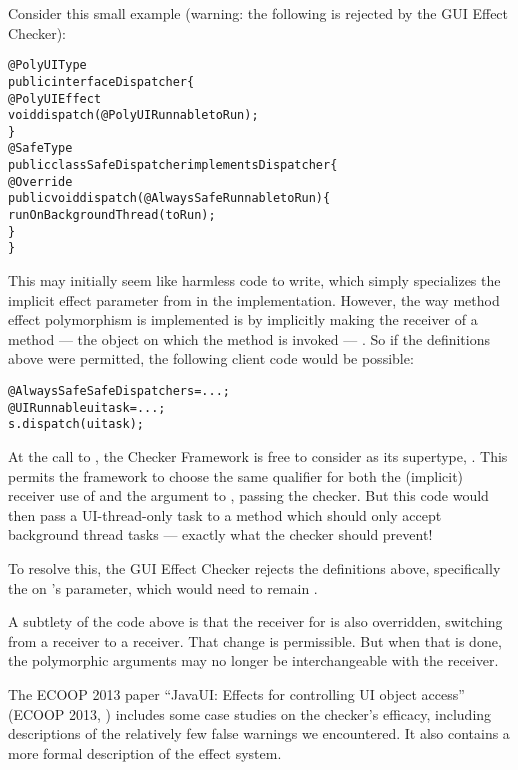 Consider this small example (warning: the following is rejected by the GUI Effect Checker):

\begin{alltt}
@PolyUIType
public interface Dispatcher \{
    @PolyUIEffect
    void dispatch(@PolyUI Runnable toRun);
\}
@SafeType
public class SafeDispatcher implements Dispatcher \{
    @Override
    public void dispatch(@AlwaysSafe Runnable toRun) \{
        runOnBackgroundThread(toRun);
    \}
\}
\end{alltt}

This may initially seem like harmless code to write, which simply specializes the implicit effect
parameter from  in the  implementation.  However, the way
method effect polymorphism is implemented is by implicitly making the receiver of a
 method --- the object on which the method is invoked --- .  So
if the definitions above were permitted, the following client code would be possible:

\begin{alltt}
@AlwaysSafe SafeDispatcher s = ...;
@UI Runnable uitask = ...;
s.dispatch(uitask);
\end{alltt}

At the call to , the Checker Framework is free to consider  as its
supertype, .  This permits the framework to choose the same qualifier for
both the (implicit) receiver use of  and the  argument to
, passing the checker.  But this code would then pass a UI-thread-only
task to a method which should only accept background thread tasks --- exactly what the checker
should prevent!

To resolve this, the GUI Effect Checker rejects the definitions above, specifically the
 on 's parameter, which would need to remain
.

A subtlety of the code above is that the receiver for  is also
overridden, switching from a  receiver to a  receiver.  That change is
permissible.  But when that is done, the polymorphic arguments may no longer be interchangeable
with the receiver.



The ECOOP 2013 paper ``JavaUI: Effects for controlling UI object
access''~\cite{GordonDEG2013} (ECOOP 2013,
)
includes some case studies on the checker's efficacy, including
descriptions of the relatively few false warnings we encountered.  It also
contains a more formal description of the effect system.


